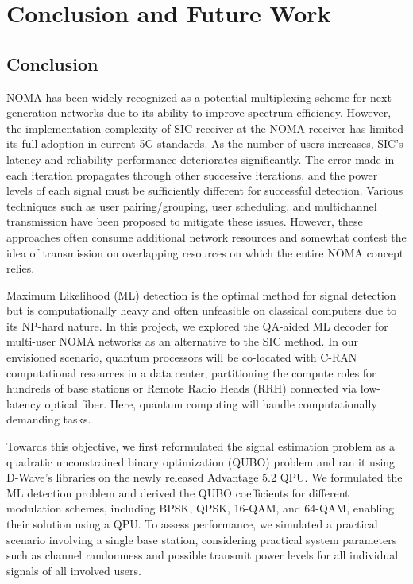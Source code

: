 \chapter{Conclusion and Future Work}
\section{Conclusion}
NOMA has been widely recognized as a potential multiplexing scheme for next-generation networks due to its ability to improve spectrum efficiency. However, the implementation complexity of SIC receiver at the NOMA receiver has limited its full adoption in current 5G standards. As the number of users increases, SIC's latency and reliability performance deteriorates significantly. The error made in each iteration propagates through other successive iterations, and the power levels of each signal must be sufficiently different for successful detection. Various techniques such as user pairing/grouping, user scheduling, and multichannel transmission have been proposed to mitigate these issues. However, these approaches often consume additional network resources and somewhat contest the idea of transmission on overlapping resources on which the entire NOMA concept relies.

Maximum Likelihood (ML) detection is the optimal method for signal detection but is computationally heavy and often unfeasible on classical computers due to its NP-hard nature. In this project, we explored the QA-aided ML decoder for multi-user NOMA networks as an alternative to the SIC method. In our envisioned scenario, quantum processors will be co-located with C-RAN computational resources in a data center, partitioning the compute roles for hundreds of base stations or Remote Radio Heads (RRH) connected via low-latency optical fiber. Here, quantum computing will handle computationally demanding tasks.

Towards this objective, we first reformulated the signal estimation problem as a quadratic unconstrained binary optimization (QUBO) problem and ran it using D-Wave’s libraries on the newly released Advantage 5.2 QPU. We formulated the ML detection problem and derived the QUBO coefficients for different modulation schemes, including BPSK, QPSK, 16-QAM, and 64-QAM, enabling their solution using a QPU. To assess performance, we simulated a practical scenario involving a single base station, considering practical system parameters such as channel randomness and possible transmit power levels for all individual signals of all involved users.

